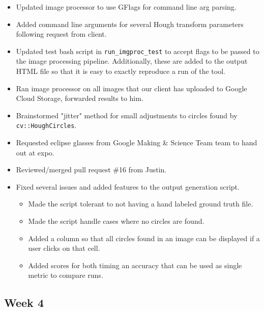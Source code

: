 \documentclass[10pt, onecolumn, draftclsnofoot, letterpaper, compsoc]{IEEEtran}
\begin{document}
    \begin{itemize}

	\item Updated image processor to use GFlags for command line arg parsing.

	\item Added command line arguments for several Hough transform parameters following request from client.

	\item Updated test bash script in \texttt{run\_imgproc\_test} to accept flags to be passed to the image
	processing pipeline. Additionally, these are added to the output HTML file so that it is easy to exactly
	reproduce a run of the tool.

	\item Ran image processor on all images that our client has uploaded to Google Cloud Storage, forwarded results
	to him.

	\item Brainstormed "jitter" method for small adjustments to circles found by \texttt{cv::HoughCircles}.

	\item Requested eclipse glasses from Google Making \& Science Team team to hand out at expo.

	\item Reviewed/merged pull request \#16 from Justin.

	\item Fixed several issues and added features to the output generation script.

	\begin{itemize}
		\item Made the script tolerant to not having a hand labeled ground truth file.
		\item Made the script handle cases where no circles are found.
		\item Added a column so that all circles found in an image can be displayed if a user clicks on that cell.
		\item Added scores for both timing an accuracy that can be used as single metric to compare runs.
	\end{itemize}

    \end{itemize}

\subsection{Week 4}
\end{document}

